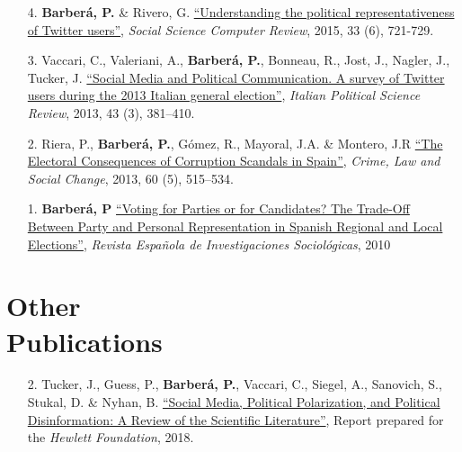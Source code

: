 \documentclass[margin,line,11pt]{resume}
\begin{document}
\begin{resume}
\begin{itemize}[leftmargin=5.5mm]
\item[4.] \textbf{Barber\'{a}, P.} \& Rivero, G. \href{http://ssc.sagepub.com/content/33/6/712}{``Understanding the political representativeness of Twitter users''}, \textit{Social Science Computer Review}, 2015, 33 (6), 721-729.

\item[3.] Vaccari, C., Valeriani, A., \textbf{Barber\'{a}, P.}, Bonneau, R., Jost, J., Nagler, J., Tucker, J. \href{http://www.rivisteweb.it/doi/10.1426/75245}{``Social Media and Political Communication. A survey of Twitter users during the 2013 Italian general election''}, \emph{Italian Political Science Review}, 2013, 43 (3), 381--410.

\item[2.] Riera, P., \textbf{Barber\'{a}, P.}, G\'{o}mez, R., Mayoral, J.A. \& Montero, J.R \href{http://link.springer.com/article/10.1007/s10611-013-9479-1}{``The Electoral Consequences of Corruption Scandals in Spain''}, \emph{Crime, Law and Social Change}, 2013, 60 (5), 515--534.

\item[1.] \textbf{Barber\'{a}, P} \href{http://www.reis.cis.es/REIS/PDF/REIS_132_021285919804928.pdf}{``Voting for Parties or for Candidates? The Trade-Off Between Party and Personal Representation in Spanish Regional and Local Elections''}, \emph{Revista Espa\~{n}ola de Investigaciones Sociol\'{o}gicas}, 2010

\end{itemize}    


\section{\mysidestyle Other\\Publications}
    
    \vspace{.15cm}    
\begin{itemize}[leftmargin=5.5mm]
\item[2.]  Tucker, J., Guess, P., \textbf{Barber\'{a}, P.}, Vaccari, C., Siegel, A., Sanovich, S., Stukal, D. \& Nyhan, B. \href{https://www.hewlett.org/library/social-media-political-polarization-political-disinformation-review-scientific-literature/}{``Social Media, Political Polarization, and Political Disinformation: A Review of the Scientific Literature''}, Report prepared for the \textit{Hewlett Foundation}, 2018.   



\end{itemize}
\end{resume}
\end{document}
